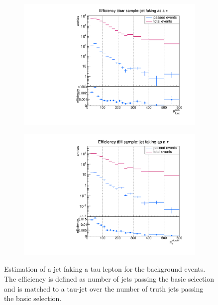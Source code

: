 \begin{figure}
  \centering
                \begin{subfigure}[t]{0.49\textwidth}
                \includegraphics[width=\textwidth]{figures/plots/ttbar/Divided_Jet.pdf}
                \label{DividedJet:bg:ttbar}
                \end{subfigure}
                \begin{subfigure}[t]{0.49\textwidth}
                \includegraphics[width=\textwidth]{figures/plots/ttH/Divided_Jet.pdf}
                \label{DividedJet:bg:ttH}
                \end{subfigure}        
\caption[Estimation of a jet faking a tau lepton for the background events.]{Estimation of a jet faking a tau lepton for the background events. The efficiency is defined as number of jets passing the basic selection and is matched to a tau-jet over the number of truth jets passing the basic selection.}
\label{DividedJet:bg}
\end{figure}
